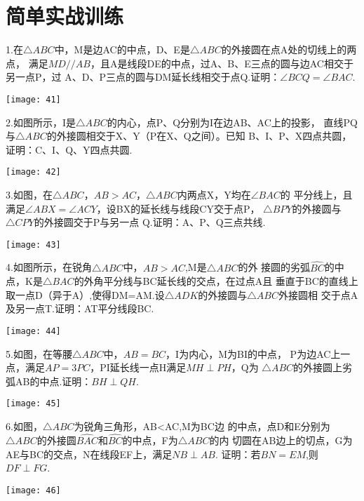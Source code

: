 \section{简单实战训练}
1.在$\bigtriangleup ABC$中，M是边AC的中点，D、E是$\bigtriangleup ABC$的外接圆在点A处的切线上的两点，
满足$MD//AB$，且A是线段DE的中点，过A、B、E三点的圆与边AC相交于另一点P，过
A、D、P三点的圆与DM延长线相交于点Q.证明：$\angle{BCQ}=\angle{BAC}$.
\begin{center}
    \texttt{[image: 41]}
\end{center}

2.如图所示，I是$\bigtriangleup ABC$的内心，点P、Q分别为I在边AB、AC上的投影，
直线PQ与$\bigtriangleup ABC$的外接圆相交于X、Y（P在X、Q之间）。已知
B、I、P、X四点共圆，证明：C、I、Q、Y四点共圆.
\begin{center}
    \texttt{[image: 42]}
\end{center}

3.如图，在$\bigtriangleup ABC$，$AB>AC$，$\bigtriangleup ABC$内两点X，Y均在$\angle{BAC}$的
平分线上，且满足$\angle{ABX}=\angle{ACY}$，设BX的延长线与线段CY交于点P，
$\bigtriangleup BPY$的外接圆与$\bigtriangleup CPY$的外接圆交于P与另一点
Q.证明：A、P、Q三点共线.
\begin{center}
    \texttt{[image: 43]}
\end{center}

4.如图所示，在锐角$\bigtriangleup ABC$中，$AB>AC$,M是$\bigtriangleup ABC$的外
接圆的劣弧$\hat{BC}$的中点，K是$\bigtriangleup BAC$的外角平分线与BC延长线的交点，在过点A且
垂直于BC的直线上取一点D（异于A）,使得DM=AM.设$\bigtriangleup ADK$的外接圆与$\bigtriangleup ABC$外接圆相
交于点A及另一点T.证明：AT平分线段BC.
\begin{center}
    \texttt{[image: 44]}
\end{center}

5.如图，在等腰$\bigtriangleup ABC$中，$AB=BC$，I为内心，M为BI的中点，
P为边AC上一点，满足$AP=3PC$，PI延长线一点H满足$MH\perp PH$，Q为
$\bigtriangleup ABC$的外接圆上劣弧AB的中点.证明：$BH\perp QH$.
\begin{center}
    \texttt{[image: 45]}
\end{center}

6.如图，$\bigtriangleup ABC$为锐角三角形，AB<AC,M为BC边
的中点，点D和E分别为$\bigtriangleup ABC$的外接圆$\hat{BAC}$和$\hat{BC}$的中点，F为$\bigtriangleup ABC$的内
切圆在AB边上的切点，G为AE与BC的交点，N在线段EF上，满足$NB\perp AB$.
证明：若$BN=EM$,则$DF\perp FG$.
\begin{center}
    \texttt{[image: 46]}
\end{center}